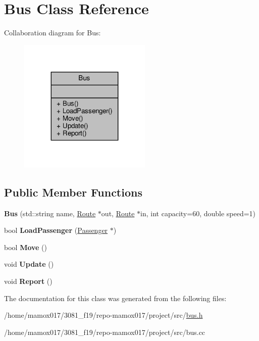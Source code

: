 \hypertarget{classBus}{}\section{Bus Class Reference}
\label{classBus}


Collaboration diagram for Bus\+:
\nopagebreak
\begin{figure}[H]
\begin{center}
\leavevmode
\includegraphics[width=179pt]{classBus__coll__graph}
\end{center}
\end{figure}
\subsection*{Public Member Functions}
\begin{DoxyCompactItemize}
\item 
\mbox{\label{classBus_aa28c3c318b6993f3a3aebf211daa9217}} 
{\bfseries Bus} (std\+::string name, \hyperlink{classRoute}{Route} $\ast$out, \hyperlink{classRoute}{Route} $\ast$in, int capacity=60, double speed=1)
\item 
\mbox{\label{classBus_ac3f1c523bc4f97bc8ada8dc488ab3484}} 
bool {\bfseries Load\+Passenger} (\hyperlink{classPassenger}{Passenger} $\ast$)
\item 
\mbox{\label{classBus_a5e667186d6db0916ebab0e4eff3312c8}} 
bool {\bfseries Move} ()
\item 
\mbox{\label{classBus_a9896f74f16966f7621d0dfafff0ec6b4}} 
void {\bfseries Update} ()
\item 
\mbox{\label{classBus_a7acce006ab0ef802350c2cf6a45dc455}} 
void {\bfseries Report} ()
\end{DoxyCompactItemize}


The documentation for this class was generated from the following files\+:\begin{DoxyCompactItemize}
\item 
/home/mamox017/3081\+\_\+f19/repo-\/mamox017/project/src/\hyperlink{bus_8h}{bus.\+h}\item 
/home/mamox017/3081\+\_\+f19/repo-\/mamox017/project/src/bus.\+cc\end{DoxyCompactItemize}
